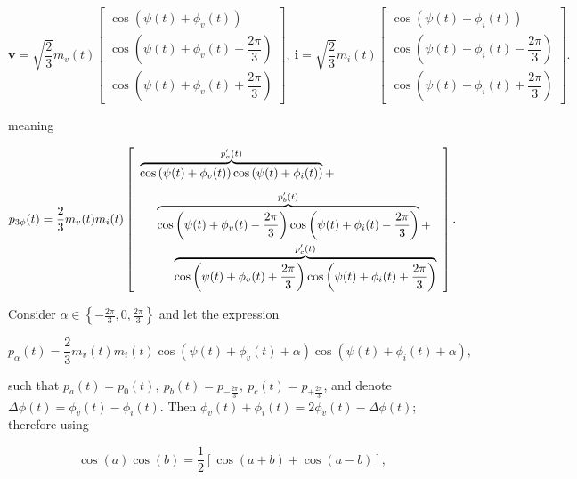 \begin{equation} \mathbf{v} = \sqrt{\dfrac{2}{3}} m_v(t) \left[\begin{array}{c} \cos\left(\psi(t) + \phi_v(t)\right) \\[3mm] \cos\left(\psi(t) + \phi_v(t) - \dfrac{2\pi}{3}\right) \\[3mm] \cos\left(\psi(t) + \phi_v(t) + \dfrac{2\pi}{3}\right)\end{array}\right],\ \mathbf{i} = \sqrt{\dfrac{2}{3}} m_i(t) \left[\begin{array}{c} \cos\left(\psi(t) + \phi_i(t)\right) \\[3mm] \cos\left(\psi(t) + \phi_i(t) - \dfrac{2\pi}{3}\right) \\[3mm] \cos\left(\psi(t) + \phi_i(t) + \dfrac{2\pi}{3}\right)\end{array}\right] .\end{equation}

	\noindent meaning

\begin{equation} p_{3\phi}(t) = \dfrac{2}{3} m_v(t)m_i(t) \left[\begin{array}{l} \overbrace{\cos\left(\psi(t) + \phi_v(t)\right)\cos\left(\psi(t) + \phi_i(t)\right)}^{p'_a(t)} + \\[3mm] \hspace{5mm} \overbrace{\cos\left(\psi(t) + \phi_v(t) - \dfrac{2\pi}{3}\right)\cos\left(\psi(t) + \phi_i(t) - \dfrac{2\pi}{3}\right)}^{p'_b(t)} + \\[3mm] \hspace{10mm} \overbrace{\cos\left(\psi(t) + \phi_v(t) + \dfrac{2\pi}{3}\right)\cos\left(\psi(t) + \phi_i(t) + \dfrac{2\pi}{3}\right)}^{p'_c(t)} \end{array} \right] .\end{equation}

	Consider $\alpha\in\left\{-\frac{2\pi}{3},0,\frac{2\pi}{3}\right\}$ and let the expression 

\begin{equation} p_\alpha(t) = \dfrac{2}{3}m_v(t)m_i(t)\cos\left(\psi(t) + \phi_v(t) + \alpha\right)\cos\left(\psi(t) + \phi_i(t) + \alpha\right), \end{equation} 

	\noindent such that $p_a(t) = p_0(t),\ p_b(t) = p_{-\frac{2\pi}{3}},\ p_c(t) = p_{+\frac{2\pi}{3}}$,  and denote $\Delta\phi(t) = \phi_v(t) - \phi_i(t)$. Then $\phi_v(t) + \phi_i(t) = 2\phi_v(t) - \Delta\phi(t)$; therefore using

\begin{equation} \cos(a)\cos(b) = \dfrac{1}{2}\left[\cos(a+b) + \cos(a-b)\right],\end{equation}

